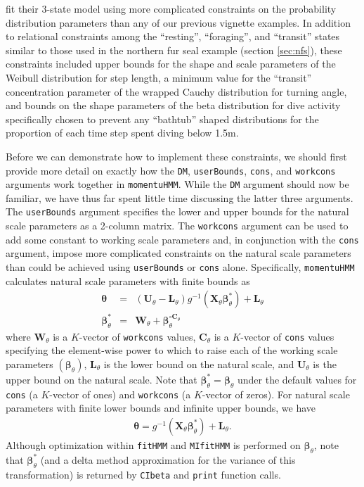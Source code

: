 \documentclass[12pt]{article}\usepackage[]{graphicx}\usepackage[]{color}
\begin{document}
\cite{McClintockEtAl2013c} fit their 3-state model using more complicated constraints on the probability distribution parameters than any of our previous vignette examples. In addition to relational constraints among the ``resting'', ``foraging'', and ``transit'' states similar to those used in the northern fur seal example (section \ref{sec:nfs}), these constraints included upper bounds for the shape and scale parameters of the Weibull distribution for step length, a minimum value for the ``transit'' concentration parameter of the wrapped Cauchy distribution for turning angle, and bounds on the shape parameters of the beta distribution for dive activity specifically chosen to prevent any ``bathtub'' shaped distributions for the proportion of each time step spent diving below 1.5m. 

Before we can demonstrate how to implement these constraints, we should first provide more detail on exactly how the \verb|DM|, \verb|userBounds|, \verb|cons|, and \verb|workcons| arguments work together in \verb|momentuHMM|. While the \verb|DM| argument should now be familiar, we have thus far spent little time discussing the latter three arguments. The \verb|userBounds| argument specifies the lower and upper bounds for the natural scale parameters as a 2-column matrix.  The \verb|workcons| argument can be used to add some constant to working scale parameters and, in conjunction with the \verb|cons| argument, impose more complicated constraints on the natural scale parameters than could be achieved using \verb|userBounds| or \verb|cons| alone. Specifically, \verb|momentuHMM| calculates natural scale parameters with finite bounds as
\begin{eqnarray}
\label{eq:link}
{\boldsymbol \theta} &=&  \left({\mathbf U}_\theta - {\mathbf L}_\theta \right) g^{-1} \left( {\mathbf X}_\theta  {\boldsymbol \beta}_\theta^* \right) + {\mathbf L}_\theta \nonumber \\ 
{\boldsymbol \beta}_\theta^* &=& {\mathbf W}_\theta + {\boldsymbol \beta}_\theta^{\circ {\mathbf C}_\theta}
\end{eqnarray}
where ${\mathbf W}_\theta$ is a $K$-vector of \verb|workcons| values, ${\mathbf C}_\theta$ is a $K$-vector of \verb|cons| values specifying the element-wise power to which to raise each of the working scale parameters $({\boldsymbol \beta}_\theta)$, ${\mathbf L}_\theta$ is the lower bound on the natural scale, and ${\mathbf U}_\theta$ is the upper bound on the natural scale.  Note that ${\boldsymbol \beta}_\theta^*={\boldsymbol \beta}_\theta$ under the default values for \verb|cons| (a $K$-vector of ones) and \verb|workcons| (a $K$-vector of zeros). For natural scale parameters with finite lower bounds and infinite upper bounds, we have
\begin{eqnarray*}
{\boldsymbol \theta} =  g^{-1} \left( {\mathbf X}_\theta  {\boldsymbol \beta}_\theta^* \right) + {\mathbf L}_\theta.
\end{eqnarray*}
Although optimization within \verb|fitHMM| and \verb|MIfitHMM| is performed on ${\boldsymbol \beta}_\theta$, note that ${\boldsymbol \beta}_\theta^*$ (and a delta method approximation for the variance of this transformation) is returned by \verb|CIbeta| and \verb|print| function calls.  
\end{document}
